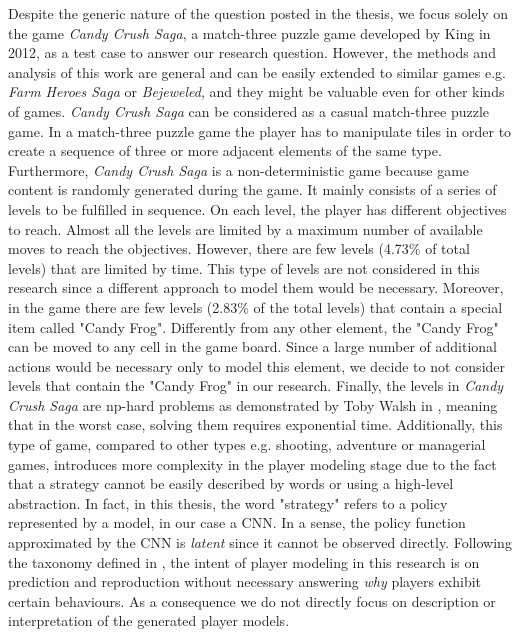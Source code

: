Despite the generic nature of the question posted in the thesis, we focus solely on the game \textit{Candy Crush Saga}, a match-three puzzle game developed by King in 2012, as a test case to answer our research question. However, the methods and analysis of this work are general and can be easily extended to similar games e.g. \textit{Farm Heroes Saga} or \textit{Bejeweled}, and they might be valuable even for other kinds of games. 
\textit{Candy Crush Saga} can be considered as a casual match-three puzzle game. In a match-three puzzle game the player has to manipulate tiles in order to create a sequence of three or more adjacent elements of the same type. Furthermore, \textit{Candy Crush Saga} is a non-deterministic game because game content is randomly generated during the game. It mainly consists of a series of levels to be fulfilled in sequence. On each level, the player has different objectives to reach. Almost all the levels are limited by a maximum number of available moves to reach the objectives. However, there are few levels (4.73\% of total levels) that are limited by time. This type of levels are not considered in this research since a different approach to model them would be necessary. Moreover, in the game there are few levels (2.83\% of the total levels) that contain a special item called "Candy Frog". Differently from any other element, the "Candy Frog" can be moved to any cell in the game board. Since a large number of additional actions would be necessary only to model this element, we decide to not consider levels that contain the "Candy Frog" in our research. Finally, the levels in \textit{Candy Crush Saga} are \acf{np-hard} problems as demonstrated by Toby Walsh in \cite{walsh_candy_2014}, meaning that in the worst case, solving them requires exponential time.
Additionally, this type of game, compared to other types e.g. shooting, adventure or managerial games, introduces more complexity in the player modeling stage due to the fact that a strategy cannot be easily described by words or using a high-level abstraction. In fact, in this thesis, the word "strategy" refers to a policy represented by a model, in our case a \acs{CNN}. In a sense, the policy function approximated by the \acs{CNN} is \textit{latent} since it cannot be observed directly. Following the taxonomy defined in \cite{holmgard_generative_2014-1}, the intent of player modeling in this research is on prediction and reproduction without necessary answering \textit{why} players exhibit certain behaviours. As a consequence we do not directly focus on description or interpretation of the generated player models.


